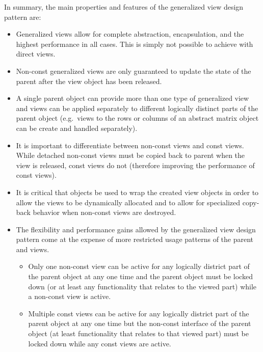 \documentclass[pdf,ps2pdf,11pt]{SANDreport}
\begin{document}
In summary, the main properties and features of the generalized view
design pattern are:

\begin{itemize}

{}\item Generalized views allow for complete abstraction,
encapsulation, and the highest performance in all cases.  This is
simply not possible to achieve with direct views.

{}\item Non-const generalized views are only guaranteed to update the
state of the parent after the view object has been released.

{}\item A single parent object can provide more than one type of
generalized view and views can be applied separately to different
logically distinct parts of the parent object (e.g.\ views to the rows
or columns of an abstract matrix object can be create and handled
separately).

{}\item It is important to differentiate between non-const views and
const views.  While detached non-const views must be copied back to
parent when the view is released, const views do not (therefore
improving the performance of const views).

{}\item It is critical that {} objects be used to wrap the
created view objects in order to allow the views to be dynamically
allocated and to allow for specialized copy-back behavior when
non-const views are destroyed.

{}\item The flexibility and performance gains allowed by the
generalized view design pattern come at the expense of more restricted usage
patterns of the parent and views.

  \begin{itemize}

  {}\item Only one non-const view can be active for any logically
  district part of the parent object at any one time and the parent
  object must be locked down (or at least any functionality that
  relates to the viewed part) while a non-const view is active.

  {}\item Multiple const views can be active for any logically
  district part of the parent object at any one time but the non-const
  interface of the parent object (at least functionality that relates
  to that viewed part) must be locked down while any const views are
  active.

  \end{itemize}

\end{itemize}
\end{document}
